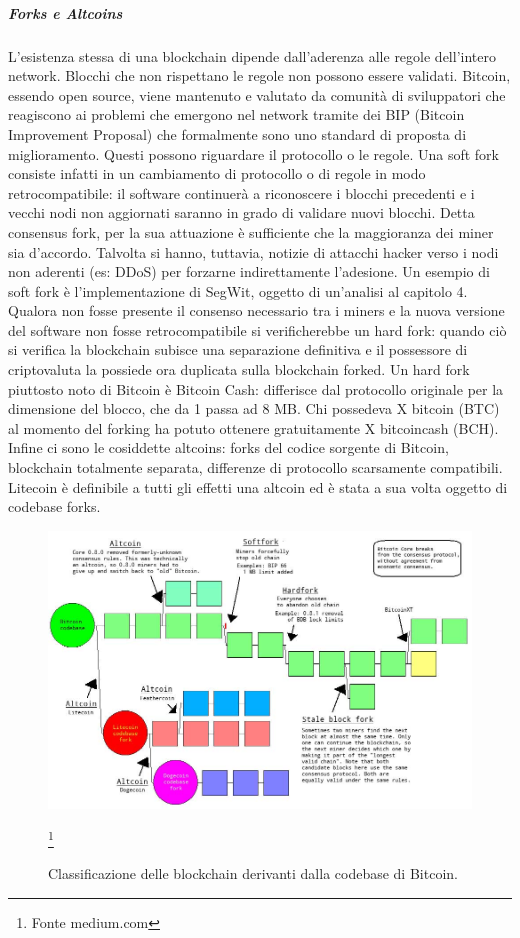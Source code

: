 \subparagraph{Forks e Altcoins}

L’esistenza stessa di una blockchain dipende dall’aderenza alle regole dell’intero network. Blocchi che non rispettano le regole non possono essere validati.
Bitcoin, essendo open source, viene mantenuto e valutato da comunità di sviluppatori che reagiscono ai problemi che emergono nel network tramite dei BIP (Bitcoin Improvement Proposal) che formalmente sono uno standard di proposta di miglioramento. Questi possono riguardare il protocollo o le regole. Una soft fork consiste infatti in un cambiamento di protocollo o di regole in modo retrocompatibile: il software continuerà a riconoscere i blocchi precedenti e i vecchi nodi non aggiornati saranno in grado di validare nuovi blocchi. Detta consensus fork, per la sua attuazione è sufficiente che la maggioranza dei miner sia d’accordo. Talvolta si hanno, tuttavia, notizie di attacchi hacker verso i nodi non aderenti (es: DDoS) per forzarne indirettamente l’adesione. Un esempio di soft fork è l’implementazione di SegWit, oggetto di un’analisi al capitolo 4.
Qualora non fosse presente il consenso necessario tra i miners e la nuova versione del software non fosse retrocompatibile si verificherebbe un hard fork: quando ciò si verifica la blockchain subisce una separazione definitiva e il possessore di criptovaluta la possiede ora duplicata sulla blockchain forked.
Un hard fork piuttosto noto di Bitcoin è Bitcoin Cash: differisce dal protocollo originale per la dimensione del blocco, che da 1 passa ad 8 MB. Chi possedeva X bitcoin (BTC) al momento del forking ha potuto ottenere gratuitamente X bitcoincash (BCH).
Infine ci sono le cosiddette altcoins: forks del codice sorgente di Bitcoin, blockchain totalmente separata, differenze di protocollo scarsamente compatibili. Litecoin è definibile a tutti gli effetti una altcoin ed è stata a sua volta oggetto di codebase forks.


\begin{figure}
	\centering
	\includegraphics[width=1.0\linewidth]{images/altcoinsoftforksetc}
	\caption{Classificazione delle blockchain derivanti dalla codebase di Bitcoin.}
	\label{fig:altcoinsoftforksetc}
	\footnote{Fonte medium.com}
\end{figure}





